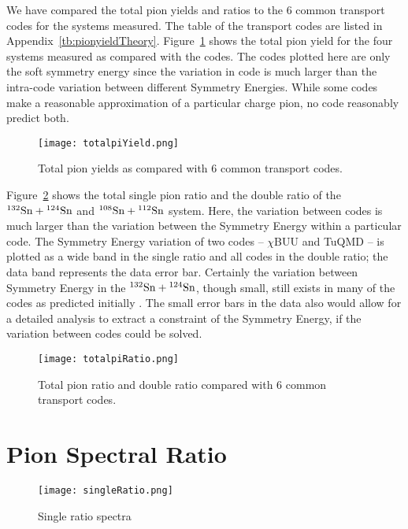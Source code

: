 We have compared the total pion yields and ratios to the 6 common transport codes for the systems measured. The table of the transport codes are listed in Appendix~\ref{tb:pionyieldTheory}. Figure~\ref{fig:totalpiYield} shows the total pion yield for the four systems measured as compared with the codes. The codes plotted here are only the soft symmetry energy since the variation in code is much larger than the intra-code variation between different Symmetry Energies. While some codes make a reasonable approximation of a particular charge pion, no code reasonably predict both. 

\begin{figure}[!htb]
\centering
\texttt{[image: totalpiYield.png]}
\caption{Total pion yields as compared with 6 common transport codes.}
\label{fig:totalpiYield}
\end{figure}

Figure~\ref{fig:totalpiRatio} shows the total single pion ratio and the double ratio of the ${}^{132}\mathrm{Sn} + {}^{124}\mathrm{Sn}$ and ${}^{108}\mathrm{Sn} + {}^{112}\mathrm{Sn}$ system. Here, the variation between codes is much larger than the variation between the Symmetry Energy within a particular code. The Symmetry Energy variation of two codes -- $\chi$BUU and TuQMD -- is plotted as a wide band in the single ratio and all codes in the double ratio; the data band represents the data error bar. Certainly the variation between Symmetry Energy in the ${}^{132}\mathrm{Sn} + {}^{124}\mathrm{Sn}$, though small, still exists in many of the codes as predicted initially \cite{baoan_piprod1,baoan_piprod2}. The small error bars in the data also would allow for a detailed analysis to extract a constraint of the Symmetry Energy, if the variation between codes could be solved. 



\begin{figure}[!htb]
\centering
\texttt{[image: totalpiRatio.png]}
\caption{Total pion ratio and double ratio compared with 6 common transport codes.}
\label{fig:totalpiRatio}
\end{figure}



\section{Pion Spectral Ratio}


\begin{figure}[!htb]
\centering
\texttt{[image: singleRatio.png]}
\caption{Single ratio spectra}
\label{fig:SRspectra}
\end{figure}

